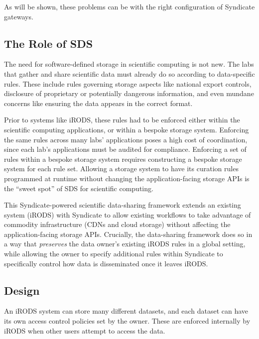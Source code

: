 As will be shown, these problems can be with the right configuration of Syndicate gateways.

\subsection{The Role of SDS}

The need for software-defined storage in scientific computing is not new.  The
labs that gather and share scientific data must already do so according to
data-specific rules.  These include rules governing storage aspects like
national export controls, disclosure of proprietary or potentially dangerous information, and
even mundane concerns like ensuring the data appears in the correct format.

Prior to systems like iRODS, these rules had to be enforced either within the
scientific computing applications, or within a bespoke storage system.
Enforcing the same rules across many labs' applications poses a high cost of
coordination, since each lab's applications must be audited for compliance.
Enforcing a set of rules within a bespoke storage system requires constructing a
bespoke storage system for each rule set.  Allowing a storage system to have its
curation rules programmed at runtime without changing the application-facing
storage APIs is the ``sweet spot'' of SDS for scientific computing.

This Syndicate-powered scientific data-sharing framework extends an existing system (iRODS) with
Syndicate to allow existing workflows to take advantage of commodity infrastructure
(CDNs and cloud storage) without affecting the application-facing storage APIs.
Crucially, the data-sharing framework does so in a way that \emph{preserves} the data owner's existing iRODS
rules in a global setting, while allowing the owner to specify additional
rules within Syndicate to specifically control how data is disseminated once it
leaves iRODS.

\subsection{Design}

An iRODS system can store many different datasets, and each dataset can have its
own access control policies set by the owner.  These are enforced internally by
iRODS when other users attempt to access the data.

